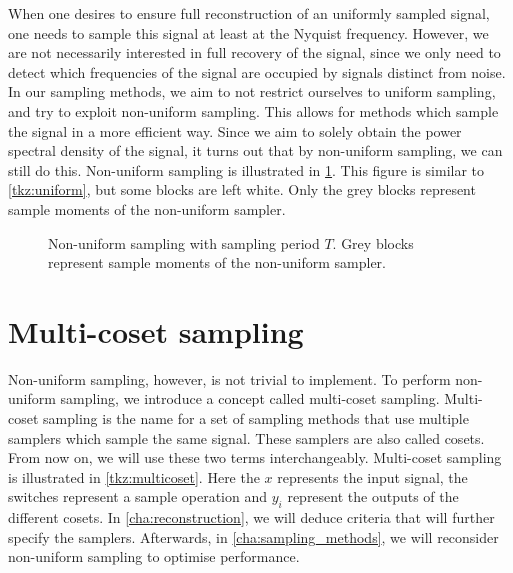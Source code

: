 \documentclass[a4paper, openany, oneside]{memoir}
\begin{document}
When one desires to ensure full reconstruction of an uniformly sampled signal, one needs to sample this signal at least at the Nyquist frequency. However, we are not necessarily interested in full recovery of the signal, since we only need to detect which frequencies of the signal are occupied by signals distinct from noise. In our sampling methods, we aim to not restrict ourselves to uniform sampling, and try to exploit non-uniform sampling. This allows for methods which sample the signal in a more efficient way. Since we aim to solely obtain the power spectral density of the signal, it turns out that by non-uniform sampling, we can still do this. Non-uniform sampling is illustrated in \cref{tkz:nonuniform}. This figure is similar to \cref{tkz:uniform}, but some blocks are left white. Only the grey blocks represent sample moments of the non-uniform sampler.

\begin{figure}[H]
\centering
{}
\caption{Non-uniform sampling with sampling period $T$. Grey blocks represent sample moments of the non-uniform sampler.}\label{tkz:nonuniform}
\end{figure}

\section{Multi-coset sampling}
Non-uniform sampling, however, is not trivial to implement. To perform non-uniform sampling, we introduce a concept called multi-coset sampling. Multi-coset sampling is the name for a set of sampling methods that use multiple samplers which sample the same signal. These samplers are also called cosets. From now on, we will use these two terms interchangeably. Multi-coset sampling is illustrated in \cref{tkz:multicoset}. Here the $x$ represents the input signal, the switches represent a sample operation and $y_i$ represent the outputs of the different cosets. In \cref{cha:reconstruction}, we will deduce criteria that will further specify the samplers. Afterwards, in \cref{cha:sampling_methods}, we will reconsider non-uniform sampling to optimise performance.
\end{document}
